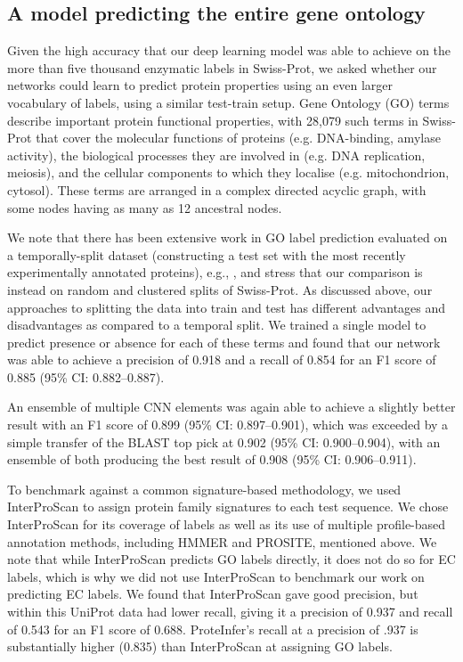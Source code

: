 \subsection*{A model predicting the entire gene ontology}
Given the high accuracy that our deep learning model was able to achieve on the more than five thousand enzymatic labels in Swiss-Prot, we asked whether our networks could learn to predict protein properties using an even larger vocabulary of labels, using a similar test-train setup. Gene Ontology \citep{ashburner2000gene, gene2019gene, carbon2009amigo} (GO) terms describe important protein functional properties, with 28,079 such terms in Swiss-Prot that cover the molecular functions of proteins (e.g. DNA-binding, amylase activity), the biological processes they are involved in (e.g. DNA replication, meiosis), and the cellular components to which they localise (e.g. mitochondrion, cytosol). These terms are arranged in a complex directed acyclic graph, with some nodes having as many as 12 ancestral nodes.

We note that there has been extensive work in GO label prediction evaluated on a temporally-split dataset (constructing a test set with the most recently experimentally annotated proteins), e.g., \citep{zhou2019cafa}, and stress that our comparison is instead on random and clustered splits of Swiss-Prot.  As discussed above, our approaches to splitting the data into train and test has different advantages and disadvantages as compared to a temporal split.
We trained a single model to predict presence or absence for each of these terms and found that our network was able to achieve a precision of 0.918 and a recall of 0.854 for an F1 score of 0.885 (95\% CI: 0.882--0.887).

An ensemble of multiple CNN elements was again able to achieve a slightly better result with an F1 score of 0.899 (95\% CI: 0.897--0.901), which was exceeded by a simple transfer of the BLAST top pick at 0.902 (95\% CI: 0.900--0.904), with an ensemble of both producing the best result of 0.908 (95\% CI: 0.906--0.911). 

To benchmark against a common signature-based methodology, we used InterProScan to assign protein family signatures to each test sequence. We chose InterProScan for its coverage of labels as well as its use of multiple profile-based annotation methods, including HMMER and PROSITE, mentioned above. We note that while InterProScan predicts GO labels directly, it does not do so for EC labels, which is why we did not use InterProScan to benchmark our work on predicting EC labels. We found that InterProScan gave good precision, but within this UniProt data had lower recall, giving it a precision of 0.937 and recall of 0.543 for an F1 score of 0.688. ProteInfer's recall at a precision of .937 is substantially higher (0.835) than InterProScan at assigning GO labels.  

